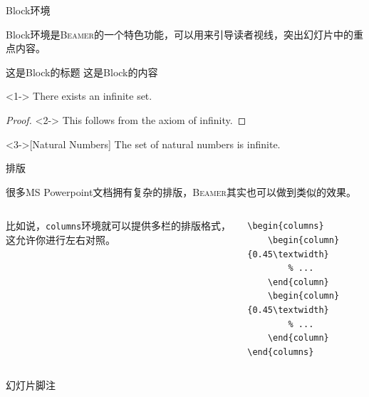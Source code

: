 \documentclass[aspectratio=169]{beamer}
\newcommand{\BibLaTeX}{\textsc{Bib}\LaTeX{}}
\newcommand{\Beamer}{\textsc{Beamer}}
\newcommand{\enableindent}{\setlength{\parskip}{6pt}\setlength{\parindent}{2em}}
\begin{document}
\begin{frame}{Block环境}

	Block环境是\Beamer{}的一个特色功能，可以用来引导读者视线，突出幻灯片中的重点内容。

	\begin{block}{这是Block的标题}
		这是Block的内容
	\end{block}

	\begin{theorem}<1->
		There exists an infinite set.
	\end{theorem}

	\begin{proof}<2->
		This follows from the axiom of infinity.
	\end{proof}

	\begin{example}<3->[Natural Numbers]
		The set of natural numbers is infinite.
	\end{example}

\end{frame}

\begin{frame}[fragile]{排版}
	\enableindent

	很多MS Powerpoint文档拥有复杂的排版，\Beamer{}其实也可以做到类似的效果。
	\begin{columns}
		\begin{column}{0.45\textwidth}
			比如说，\texttt{columns}环境就可以提供多栏的排版格式，这允许你进行左右对照。
		\end{column}
		\begin{column}{0.45\textwidth}
			\begin{verbatim}
\begin{columns}
    \begin{column}{0.45\textwidth}
        % ...
    \end{column}
    \begin{column}{0.45\textwidth}
        % ...
    \end{column}
\end{columns}
\end{verbatim}
		\end{column}
	\end{columns}
\end{frame}

\begin{frame}[fragile]{幻灯片脚注}

\end{frame}
\end{document}
